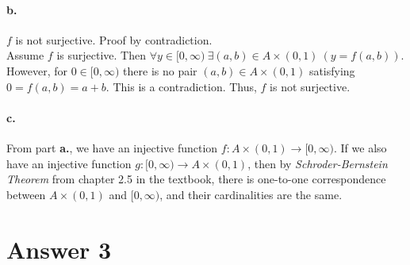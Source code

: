 \documentclass[11pt]{article}
\begin{document}
\paragraph{b.} $f$ is not surjective. Proof by contradiction. \\

Assume $f$ is surjective. Then $\forall y \in [0, \infty) \ \exists (a, b) \in A \times (0, 1) \ (y = f(a, b))$. However, for $0 \in [0, \infty)$ there is no pair $(a, b) \in A \times (0, 1)$ satisfying $0 = f(a, b) = a + b$. This is a contradiction. Thus, $f$ is not surjective. \\

\paragraph{c.} From part \textbf{a.}, we have an injective function $f: A \times (0, 1) \rightarrow [0, \infty)$. If we also have an injective function $g: [0, \infty) \rightarrow A \times (0, 1)$, then by \textit{Schroder-Bernstein Theorem} from chapter 2.5 in the textbook, there is one-to-one correspondence between $A \times (0, 1)$ and $[0, \infty)$, and their cardinalities are the same.

\newpage
\section*{Answer 3}
\end{document}
